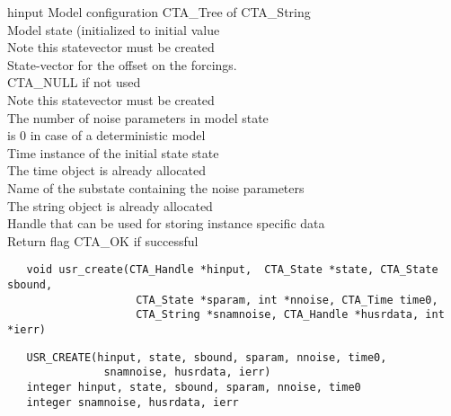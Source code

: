 \horzline
\begin{tabbing}
\functab
{}
 {hinput}    {Model configuration CTA\_Tree of CTA\_String}\\
     {Model state (initialized to initial value}\\
\funcline{}   {}          {Note this statevector must be created}\\
    {State-vector for the offset on the forcings.}\\
\funcline{}   {}          {CTA\_NULL if not used}\\
\funcline{}   {}          {Note this statevector must be created}\\
    {The number of noise parameters in model state}\\
\funcline{}   {}          {is 0 in case of a deterministic model}\\
     {Time instance of the initial state state}\\
\funcline{}   {}          {The time object is already allocated}\\
 {Name of the substate containing the noise parameters}\\
\funcline{}   {}          {The string object is already allocated}\\
  {Handle that can be used for storing instance specific data}\\
      {Return flag CTA\_OK if successful}\\


\end{tabbing}
\horzline

\begin{verbatim}
   void usr_create(CTA_Handle *hinput,  CTA_State *state, CTA_State sbound, 
                    CTA_State *sparam, int *nnoise, CTA_Time time0, 
                    CTA_String *snamnoise, CTA_Handle *husrdata, int *ierr)
\end{verbatim}

\begin{verbatim}
   USR_CREATE(hinput, state, sbound, sparam, nnoise, time0, 
               snamnoise, husrdata, ierr)
   integer hinput, state, sbound, sparam, nnoise, time0 
   integer snamnoise, husrdata, ierr
\end{verbatim}

